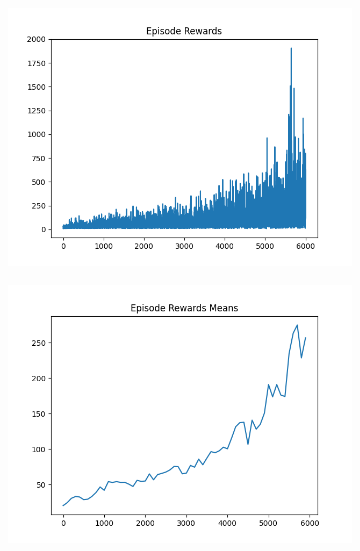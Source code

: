 \begin{figure}[H]
    \centering
    \begin{subfigure}{.47\linewidth}
        \centering
        \includegraphics[width=\textwidth]{pole/2024-06-14_18-05-51_dqn_cartpole_episode_rewards.png}
    \end{subfigure}
    \begin{subfigure}{.47\linewidth}
        \centering
        \includegraphics[width=\textwidth]{pole/2024-06-14_18-05-51_dqn_cartpole_episode_rewards_means.png}
    \end{subfigure}
    \begin{subfigure}{.47\linewidth}
        \centering

\end{subfigure}
\end{figure}
